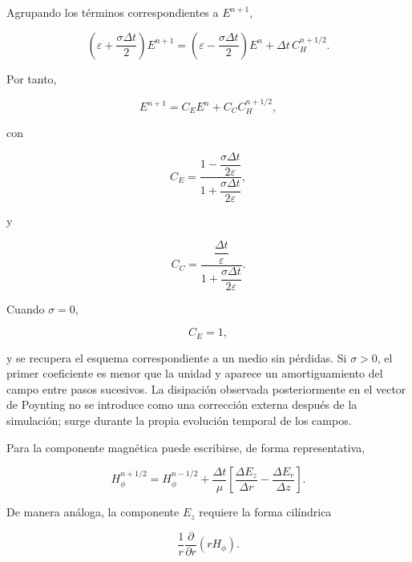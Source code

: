 Agrupando los términos correspondientes a $E^{n+1}$,

\begin{equation}
\left(
\varepsilon+
\frac{\sigma\Delta t}{2}
\right)
E^{n+1}
=
\left(
\varepsilon-
\frac{\sigma\Delta t}{2}
\right)
E^n
+
\Delta t\,C_H^{n+1/2}.
\end{equation}

Por tanto,

\begin{equation}
E^{n+1}
=
C_E E^n
+
C_C C_H^{n+1/2},
\label{eq:update_E}
\end{equation}

con

\begin{equation}
C_E
=
\frac{
1-\dfrac{\sigma\Delta t}{2\varepsilon}
}{
1+\dfrac{\sigma\Delta t}{2\varepsilon}
},
\end{equation}

y

\begin{equation}
C_C
=
\frac{
\dfrac{\Delta t}{\varepsilon}
}{
1+\dfrac{\sigma\Delta t}{2\varepsilon}
}.
\end{equation}

Cuando $\sigma=0$,

\begin{equation}
C_E=1,
\end{equation}

y se recupera el esquema correspondiente a un medio sin pérdidas. Si $\sigma>0$, el primer coeficiente es menor que la unidad y aparece un amortiguamiento del campo entre pasos sucesivos. La disipación observada posteriormente en el vector de Poynting no se introduce como una corrección externa después de la simulación; surge durante la propia evolución temporal de los campos.

Para la componente magnética puede escribirse, de forma representativa,

\begin{equation}
H_{\phi}^{n+1/2}
=
H_{\phi}^{n-1/2}
+
\frac{\Delta t}{\mu}
\left[
\frac{\Delta E_z}{\Delta r}
-
\frac{\Delta E_r}{\Delta z}
\right].
\label{eq:update_H}
\end{equation}

De manera análoga, la componente $E_z$ requiere la forma cilíndrica

\begin{equation}
\frac{1}{r}
\frac{\partial}{\partial r}
(rH_\phi).
\end{equation}

